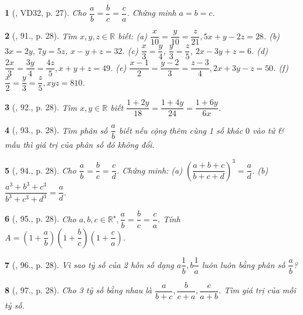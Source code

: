 \documentclass{article}
\newtheorem{baitoan}{}
\begin{document}
\begin{baitoan}[\cite{Binh_Toan_7_tap_1}, VD32, p. 27]
	Cho $\dfrac{a}{b} = \dfrac{b}{c} = \dfrac{c}{a}$. Chứng minh $a = b = c$.
\end{baitoan}

\begin{baitoan}[\cite{Binh_Toan_7_tap_1}, 91., p. 28]
	Tìm $x,y,z\in\mathbb{R}$ biết: (a) $\dfrac{x}{10} = \dfrac{y}{10} = \dfrac{z}{21},5x + y - 2z = 28$. (b) $3x = 2y$, $7y = 5z$, $x - y + z = 32$. (c) $\dfrac{x}{3} = \dfrac{y}{4}$, $\dfrac{y}{3} = \dfrac{z}{5}$, $2x - 3y + z = 6$. (d) $\dfrac{2x}{3} = \dfrac{3y}{4} = \dfrac{4z}{5},x + y + z = 49$. (e) $\dfrac{x - 1}{2} = \dfrac{y - 2}{3} = \dfrac{z - 3}{4},2x + 3y - z = 50$. (f) $\dfrac{x}{2} = \dfrac{y}{3} = \dfrac{z}{5},xyz = 810$.	
\end{baitoan}

\begin{baitoan}[\cite{Binh_Toan_7_tap_1}, 92., p. 28]
	Tìm $x,y\in\mathbb{R}$ biết $\dfrac{1 + 2y}{18} = \dfrac{1 + 4y}{24} = \dfrac{1 + 6y}{6x}$.
\end{baitoan}

\begin{baitoan}[\cite{Binh_Toan_7_tap_1}, 93., p. 28]
	Tìm phân số $\dfrac{a}{b}$ biết nếu cộng thêm cùng 1 số khác $0$ vào tử \& mẫu thì giá trị của phân số đó không đổi.
\end{baitoan}

\begin{baitoan}[\cite{Binh_Toan_7_tap_1}, 94., p. 28]
	Cho $\dfrac{a}{b} = \dfrac{b}{c} = \dfrac{c}{d}$. Chứng minh: (a) $\left(\dfrac{a + b + c}{b + c + d}\right)^3 = \dfrac{a}{d}$. (b) $\dfrac{a^3 + b^3 + c^3}{b^3 + c^3 + d^3} = \dfrac{a}{d}$.
\end{baitoan}

\begin{baitoan}[\cite{Binh_Toan_7_tap_1}, 95., p. 28]
	Cho $a,b,c\in\mathbb{R}^\star,\dfrac{a}{b} = \dfrac{b}{c} = \dfrac{c}{a}$. Tính $A = \left(1 + \dfrac{a}{b}\right)\left(1 + \dfrac{b}{c}\right)\left(1 + \dfrac{c}{a}\right)$.
\end{baitoan}

\begin{baitoan}[\cite{Binh_Toan_7_tap_1}, 96., p. 28]
	Vì sao tỷ số của 2 hỗn số dạng $a\dfrac{1}{b},b\dfrac{1}{a}$ luôn luôn bằng phân số $\dfrac{a}{b}$?
\end{baitoan}

\begin{baitoan}[\cite{Binh_Toan_7_tap_1}, 97., p. 28]
	Cho 3 tỷ số bằng nhau là $\dfrac{a}{b + c},\dfrac{b}{c + a},\dfrac{c}{a + b}$. Tìm giá trị của mỗi tỷ số.
\end{baitoan}
\end{document}
